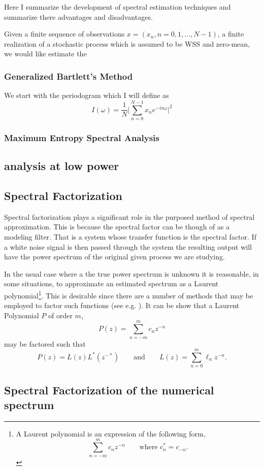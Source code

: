 \documentclass[12pt]{amsart}
\begin{document}
Here I summarize the development of spectral estimation techniques and summarize there advantages and disadvantages.

Given a finite sequence of observations $x = (x_n, n = 0, 1, \dots, N-1)$, a finite realization of a stochastic process which is assumed to be WSS and zero-mean,  we would like estimate the 

\subsubsection{Generalized Bartlett's Method}
We start with the periodogram which I will define as 
$$ I(\omega) = \frac{1}{N}\bigg|\sum_{n=0}^{N-1} x_n e^{-in\omega}\bigg|^2$$


\subsubsection{Maximum Entropy Spectral Analysis}


\subsection{analysis at low power}

\subsection{Spectral Factorization}
Spectral factorization plays a significant role in the purposed method of spectral approximation. This is because the spectral factor can be though of as a modeling filter. That is a system whose transfer function is the spectral factor. If a white noise signal is then passed through the system the resulting output will have the power spectrum of the original given process we are studying.   

In the usual case where a the true power spectrum is unknown it is reasonable, in some situations, to approximate an estimated spectrum as a Laurent polynomial\footnote{
	A Laurent polynomial is an expression of the following form,
	$$\sum_{n=-m}^m c_nz^{-n}\qquad \text{where }c_n^* = c_{-n}.$$
}. This is desirable since there are a number of methods that may be employed to factor such functions (see e.g. \cite{sayed2001}). It can be show that a Laurent Polynomial $P$ of order $m$,
$$P(z) = \sum_{n=-m}^m c_n z^{-n}$$
may be factored such that 
$$P(z) = L(z)L^*(z^{-*}) \qquad \text{and}\qquad L(z) = \sum_{n=0}^m \ell_n z^{-n}.$$

\subsection{Spectral Factorization of the numerical spectrum}
\end{document}
